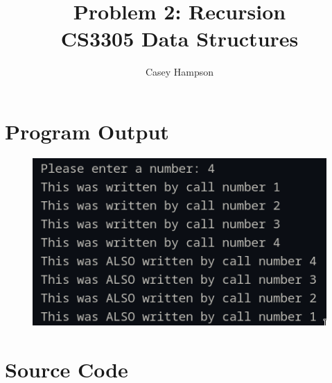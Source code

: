 \documentclass{article}
\title{Problem 2: Recursion \\[8pt] CS3305 Data Structures}
\author{Casey Hampson}
\begin{document}
\maketitle



\section*{Program Output}
\begin{figure}[ht]
    \centering
    \includegraphics[scale=0.8]{res/output.png}
\end{figure}


\pagebreak
\section*{Source Code}
\inputminted{java}{./P2.java}
\end{document}

